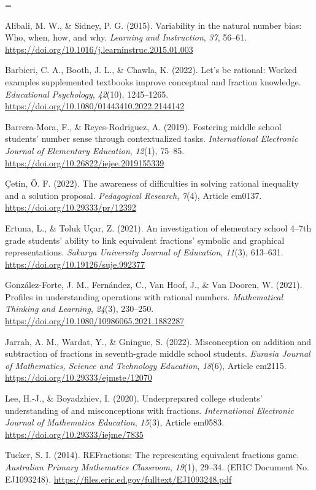 \documentclass[a4paper,12pt]{article}
\begin{document}
{\TimesEn\linespread{1.0}\selectfont\fontsize{10.8pt}{16.2pt}\selectfont
\setlength{\parskip}{3.8pt}
\everypar={\hangindent=0.85cm }

Alibali, M. W., \& Sidney, P. G. (2015). Variability in the natural number bias: Who, when, how, and why. \textit{Learning and Instruction}, \textit{37}, 56--61. \url{https://doi.org/10.1016/j.learninstruc.2015.01.003}

Barbieri, C. A., Booth, J. L., \& Chawla, K. (2022). Let's be rational: Worked examples supplemented textbooks improve conceptual and fraction knowledge. \textit{Educational Psychology}, \textit{42}(10), 1245--1265. \url{https://doi.org/10.1080/01443410.2022.2144142}

Barrera-Mora, F., \& Reyes-Rodriguez, A. (2019). Fostering middle school students' number sense through contextualized tasks. \textit{International Electronic Journal of Elementary Education}, \textit{12}(1), 75--85. \url{https://doi.org/10.26822/iejee.2019155339}

Çetin, Ö. F. (2022). The awareness of difficulties in solving rational inequality and a solution proposal. \textit{Pedagogical Research}, \textit{7}(4), Article em0137. \url{https://doi.org/10.29333/pr/12392}

Ertuna, L., \& Toluk Uçar, Z. (2021). An investigation of elementary school 4--7th grade students' ability to link equivalent fractions' symbolic and graphical representations. \textit{Sakarya University Journal of Education}, \textit{11}(3), 613--631. \url{https://doi.org/10.19126/suje.992377}

González-Forte, J. M., Fernández, C., Van Hoof, J., \& Van Dooren, W. (2021). Profiles in understanding operations with rational numbers. \textit{Mathematical Thinking and Learning}, \textit{24}(3), 230--250. \url{https://doi.org/10.1080/10986065.2021.1882287}

Jarrah, A. M., Wardat, Y., \& Gningue, S. (2022). Misconception on addition and subtraction of fractions in seventh-grade middle school students. \textit{Eurasia Journal of Mathematics, Science and Technology Education}, \textit{18}(6), Article em2115. \url{https://doi.org/10.29333/ejmste/12070}

Lee, H.-J., \& Boyadzhiev, I. (2020). Underprepared college students' understanding of and misconceptions with fractions. \textit{International Electronic Journal of Mathematics Education}, \textit{15}(3), Article em0583. \url{https://doi.org/10.29333/iejme/7835}

Tucker, S. I. (2014). REFractions: The representing equivalent fractions game. \textit{Australian Primary Mathematics Classroom}, \textit{19}(1), 29--34. (ERIC Document No. EJ1093248). \url{https://files.eric.ed.gov/fulltext/EJ1093248.pdf}

}
\end{document}
